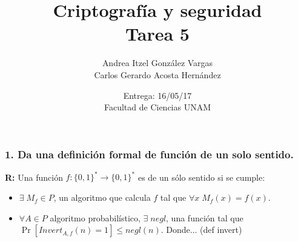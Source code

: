 \documentclass[14pt]{article}
\title{Criptografía y seguridad \\ Tarea 5}
\author{Andrea Itzel González Vargas \\ Carlos Gerardo Acosta Hernández}
\date{Entrega: 16/05/17 \\ Facultad de Ciencias UNAM}
\begin{document}
\maketitle

\subsubsection*{1. Da una definición formal de función de un solo sentido.}
\textbf{R:} Una función $f : \{0,1\}^* \to \{0,1\}^*$ es de un sólo sentido si se cumple:
\begin{itemize}
\item $\exists\; M_f \in P$, un algoritmo que calcula $f$ tal que $\forall x \;M_f(x) = f(x)$. 
\item $\forall A \in P$ algoritmo probabilístico, $\exists \;negl$, una función tal que $\Pr[Invert_{A,f}(n) = 1] \leq negl(n)$.
  Donde... (def invert)
\end{itemize}
\end{document}
